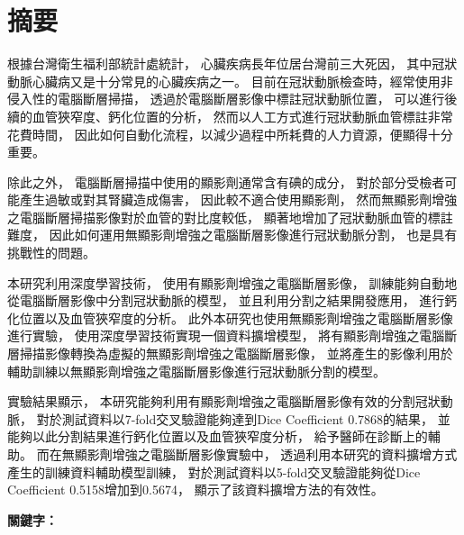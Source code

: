 \documentclass[class=NCU_thesis, crop=false]{standalone}
\begin{document}
\chapter{摘要}
根據台灣衛生福利部統計處統計，
心臟疾病長年位居台灣前三大死因，
其中冠狀動脈心臟病又是十分常見的心臟疾病之一。
目前在冠狀動脈檢查時，經常使用非侵入性的電腦斷層掃描，
透過於電腦斷層影像中標註冠狀動脈位置，
可以進行後續的血管狹窄度、鈣化位置的分析，
然而以人工方式進行冠狀動脈血管標註非常花費時間，
因此如何自動化流程，以減少過程中所耗費的人力資源，便顯得十分重要。

除此之外，
電腦斷層掃描中使用的顯影劑通常含有碘的成分，
對於部分受檢者可能產生過敏或對其腎臟造成傷害，
因此較不適合使用顯影劑，
然而無顯影劑增強之電腦斷層掃描影像對於血管的對比度較低，
顯著地增加了冠狀動脈血管的標註難度，
因此如何運用無顯影劑增強之電腦斷層影像進行冠狀動脈分割，
也是具有挑戰性的問題。

本研究利用深度學習技術，
使用有顯影劑增強之電腦斷層影像，
訓練能夠自動地從電腦斷層影像中分割冠狀動脈的模型，
並且利用分割之結果開發應用，
進行鈣化位置以及血管狹窄度的分析。
此外本研究也使用無顯影劑增強之電腦斷層影像進行實驗，
使用深度學習技術實現一個資料擴增模型，
將有顯影劑增強之電腦斷層掃描影像轉換為虛擬的無顯影劑增強之電腦斷層影像，
並將產生的影像利用於輔助訓練以無顯影劑增強之電腦斷層影像進行冠狀動脈分割的模型。

實驗結果顯示，
本研究能夠利用有顯影劑增強之電腦斷層影像有效的分割冠狀動脈，
對於測試資料以7-fold交叉驗證能夠達到Dice Coefficient 0.7868的結果，
並能夠以此分割結果進行鈣化位置以及血管狹窄度分析，
給予醫師在診斷上的輔助。
而在無顯影劑增強之電腦斷層影像實驗中，
透過利用本研究的資料擴增方式產生的訓練資料輔助模型訓練，
對於測試資料以5-fold交叉驗證能夠從Dice Coefficient 0.5158增加到0.5674，
顯示了該資料擴增方法的有效性。

\vspace{2em}
\noindent \textbf{關鍵字：} \keywordsZh{} %
\end{document}

